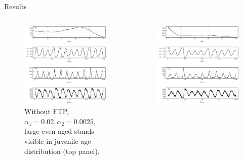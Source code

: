 \documentclass{beamer}
\begin{document}
\begin{frame}{Results}
    \begin{columns}
        \begin{column}[]{0.5\textwidth}
            \begin{figure}
                \includegraphics[width=\textwidth]{mpb/z1_ts.pdf}
                \caption{\small Without FTP, $\alpha_1 = 0.02,  \alpha_2 = 0.0025$, large even aged stands visible in juvenile age distribution (top panel).}
            \end{figure}
        \end{column}
        \begin{column}[]{0.5\textwidth}
            \begin{figure}
                \includegraphics[width=\textwidth]{mpb/z1_ftp.pdf}

\end{figure}
\end{column}
\end{columns}
\end{frame}
\end{document}
